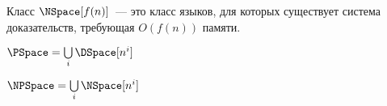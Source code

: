 Класс ${\NSpace}[f(n)]$~--- это класс языков, для которых существует система доказательств, требующая $O(f(n))$ памяти.

$\PSpace = \bigcup\limits_i {\DSpace}[n^i]$

$\NPSpace = \bigcup\limits_i {\NSpace}[n^i]$